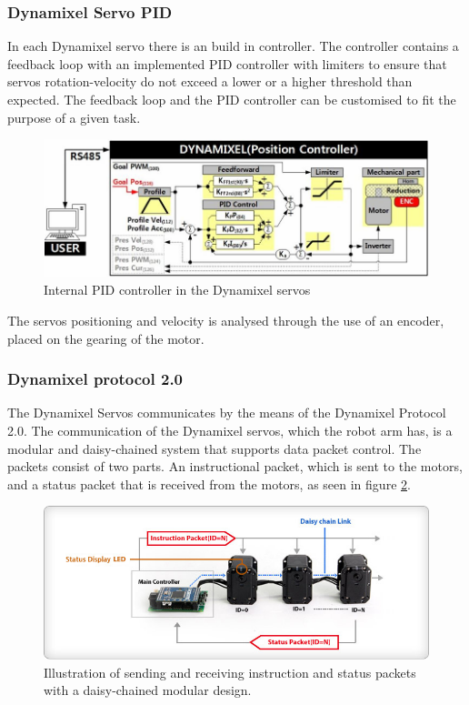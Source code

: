 \subsubsection{Dynamixel Servo PID}
In each Dynamixel servo there is an build in controller. The controller contains a feedback loop with an implemented PID controller with limiters to ensure that servos rotation-velocity do not exceed a lower or a higher threshold than expected\cite{PIDmxx}. The feedback loop and the PID controller can be customised to fit the purpose of a given task.
\begin{figure}[H]
    \centering
    \includegraphics[width=\textwidth]{Figures/Technical_figures/PIDMX.PNG}
    \caption{Internal PID controller in the Dynamixel servos\cite{PIDmxx}}
    \label{fig:PIDMX}
\end{figure}
\noindent
The servos positioning and velocity is analysed through the use of an encoder, placed on the gearing of the motor. 

\subsubsection{Dynamixel protocol 2.0}\label{DynaProto2}
The Dynamixel Servos communicates by the means of the Dynamixel Protocol 2.0.
The communication of the Dynamixel servos, which the robot arm has, is a modular and daisy-chained system that supports data packet control. The packets consist of two parts. An instructional packet, which is sent to the motors, and a status packet that is received from the motors, as seen in figure \ref{fig:DynamixelStructure}. 


\begin{figure}[H]
 \centering
\includegraphics[width=\textwidth]{Figures/Technical_figures/dynamixel-03-2012.jpg}
 \caption{Illustration of sending and receiving  instruction and status packets with a daisy-chained modular design. \cite{DASIY}}
 \label{fig:DynamixelStructure} 
\end{figure}

